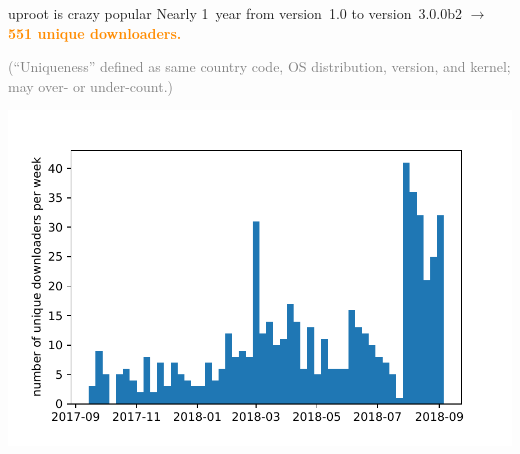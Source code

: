 \documentclass[aspectratio=169]{beamer}
\begin{document}
\begin{frame}{uproot is crazy popular}
\vspace{0.5 cm}
Nearly 1~year from version~1.0 to version~3.0.0b2 $\to$ \textcolor{darkorange}{\bf 551 unique downloaders.}

\textcolor{gray}{\scriptsize (``Uniqueness'' defined as same country code, OS distribution, version, and kernel; may over- or under-count.)}

\includegraphics[height=4.2 cm]{uproot-pip-vsweek.pdf}
\end{frame}
\end{document}
